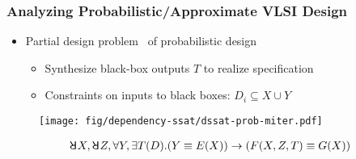\begin{frame}
  \frametitle{Analyzing Probabilistic/Approximate VLSI Design}
  \begin{itemize}
    \item Partial design problem~\cite{Gitina2013} of probabilistic design
          \pause
          \begin{itemize}
            \item Synthesize black-box outputs $T$ to realize specification
                  \pause
            \item \alert{Constraints on inputs} to black boxes: $D_i \subseteq X \cup Y$
          \end{itemize}
  \end{itemize}
  \pause
  \begin{figure}
    \centering
    \texttt{[image: fig/dependency-ssat/dssat-prob-miter.pdf]}
  \end{figure}
  \pause
  \begin{align*}
    \random{} X,\random{} Z,\forall Y,\exists T(D).
    (Y \equiv E(X)) \limply (F(X,Z,T) \equiv G(X))
  \end{align*}
\end{frame}